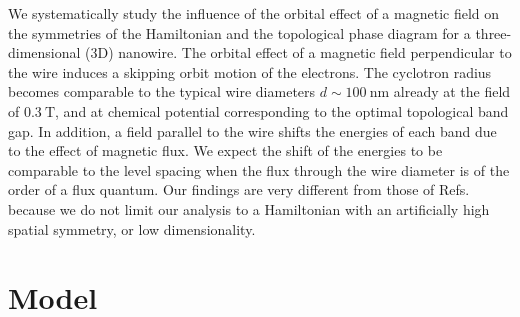 We systematically study the influence of the orbital effect of a magnetic field on the symmetries of the Hamiltonian and the topological phase diagram for a three-dimensional (3D) nanowire.
The orbital effect of a magnetic field perpendicular to the wire induces a skipping orbit motion of the electrons.
The cyclotron radius becomes comparable to the typical wire diameters $d \sim \SI{100}{\nano\metre}$ already at the field of $\SI{0.3}{\tesla}$, and at chemical potential corresponding to the optimal topological band gap.
In addition, a field parallel to the wire shifts the energies of each band due to the effect of magnetic flux.
We expect the shift of the energies to be comparable to the level spacing when the flux through the wire diameter is of the order of a flux quantum.
Our findings are very different from those of Refs.~\cite{Osca2015,Lim2013,Lim2012} because we do not limit our analysis to a Hamiltonian with an artificially high spatial symmetry, or low dimensionality.


\section{Model}


